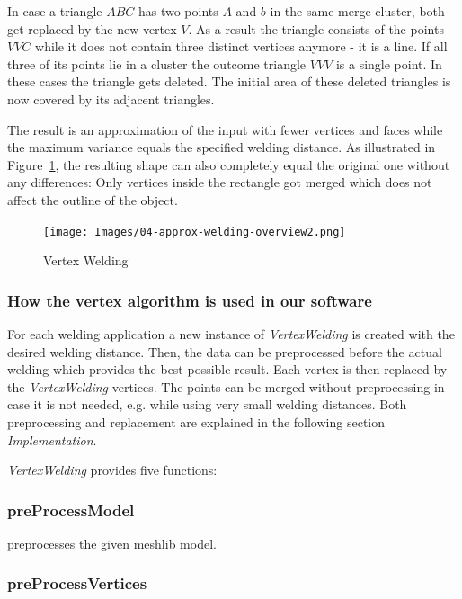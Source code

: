 \documentclass[../ClassicThesis.tex]{subfiles}
\begin{document}
In case a triangle $ABC$ has two points $A$ and $b$ in the same merge cluster, both get replaced by the new vertex $V$. As a result the triangle consists of the points $VVC$ while it does not contain three distinct vertices anymore - it is a line. If all three of its points lie in a cluster the outcome triangle $VVV$ is a single point. In these cases the triangle gets deleted. The initial area of these deleted triangles is now covered by its adjacent triangles.

The result is an approximation of the input with fewer vertices and faces while the maximum variance equals the specified welding distance. As illustrated in Figure~\ref{fig:vertex_welding}, the resulting shape can also completely equal the original one without any differences: Only vertices inside the rectangle got merged which does not affect the outline of the object.



\begin{figure}
\texttt{[image: Images/04-approx-welding-overview2.png]}
\caption{Vertex Welding}
\label{fig:vertex_welding}
\end{figure}

\subsubsection{How the vertex algorithm is used in our software}

For each welding application a new instance of \emph{VertexWelding} is created with the desired welding distance. Then, the data can be preprocessed before the actual welding which provides the best possible result. Each vertex is then replaced by the \emph{VertexWelding} vertices. The points can be merged without preprocessing in case it is not needed, e.g. while using very small welding distances. Both preprocessing and replacement are explained in the following section \emph{Implementation}.

\emph{VertexWelding} provides five functions:

\subsubsection*{preProcessModel}

preprocesses the given meshlib model.

\subsubsection*{preProcessVertices}
\end{document}

